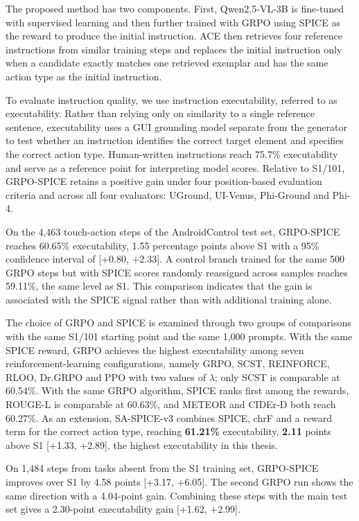 The proposed method has two components. First, Qwen2.5-VL-3B is fine-tuned with supervised learning and then further trained with GRPO using SPICE as the reward to produce the initial instruction. ACE then retrieves four reference instructions from similar training steps and replaces the initial instruction only when a candidate exactly matches one retrieved exemplar and has the same action type as the initial instruction.

To evaluate instruction quality, we use instruction executability, referred to as executability. Rather than relying only on similarity to a single reference sentence, executability uses a GUI grounding model separate from the generator to test whether an instruction identifies the correct target element and specifies the correct action type. Human-written instructions reach 75.7\% executability and serve as a reference point for interpreting model scores. Relative to S1/101, GRPO-SPICE retains a positive gain under four position-based evaluation criteria and across all four evaluators: UGround, UI-Venus, Phi-Ground and Phi-4.

On the 4,463 touch-action steps of the AndroidControl test set, GRPO-SPICE reaches 60.65\% executability, 1.55 percentage points above S1 with a 95\% confidence interval of [+0.80, +2.33]. A control branch trained for the same 500 GRPO steps but with SPICE scores randomly reassigned across samples reaches 59.11\%, the same level as S1. This comparison indicates that the gain is associated with the SPICE signal rather than with additional training alone.

The choice of GRPO and SPICE is examined through two groups of comparisons with the same S1/101 starting point and the same 1,000 prompts. With the same SPICE reward, GRPO achieves the highest executability among seven reinforcement-learning configurations, namely GRPO, SCST, REINFORCE, RLOO, Dr.GRPO and PPO with two values of $\lambda$; only SCST is comparable at 60.54\%. With the same GRPO algorithm, SPICE ranks first among the rewards, ROUGE-L is comparable at 60.63\%, and METEOR and CIDEr-D both reach 60.27\%. As an extension, SA-SPICE-v3 combines SPICE, chrF and a reward term for the correct action type, reaching \textbf{61.21\%} executability, \textbf{2.11} points above S1 [+1.33, +2.89], the highest executability in this thesis.

On 1,484 steps from tasks absent from the S1 training set, GRPO-SPICE improves over S1 by 4.58 points [+3.17, +6.05]. The second GRPO run shows the same direction with a 4.04-point gain. Combining these steps with the main test set gives a 2.30-point executability gain [+1.62, +2.99].

